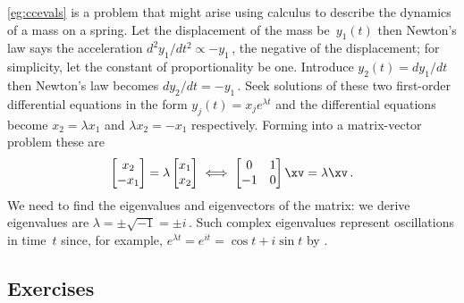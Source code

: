 \autoref{eg:ccevals} is a problem that might arise using calculus to describe the dynamics of a mass on a spring.  
Let the displacement of the mass be~\(y_1(t)\) then Newton's law says the acceleration \(d^2y_1/dt^2\propto -y_1\)\,, the negative of the displacement; for simplicity, let the constant of proportionality be one.  
Introduce \(y_2(t)=dy_1/dt\) then Newton's law becomes \(dy_2/dt=-y_1\)\,.  
Seek solutions of these two first-order differential equations in the form \(y_j(t)=x_je^{\lambda t}\) and the differential equations become \(x_2=\lambda x_1\) and \(\lambda x_2=-x_1\) respectively.  
Forming into a matrix-vector problem these are
\begin{equation*}
\begin{bmatrix} x_2\\-x_1 \end{bmatrix}
=\lambda\begin{bmatrix} x_1\\x_2 \end{bmatrix}
\iff
\begin{bmatrix} 0&1\\-1&0 \end{bmatrix}\xv=\lambda\xv\,.
\end{equation*}
We need to find the eigenvalues and eigenvectors of the matrix: we derive eigenvalues are \(\lambda=\pm \sqrt{-1}=\pm i\)\,. 
Such complex eigenvalues represent oscillations in time~\(t\) since, for example, \(e^{\lambda t}=e^{it}=\cos t+i\sin t\) by .








\subsection{Exercises}


